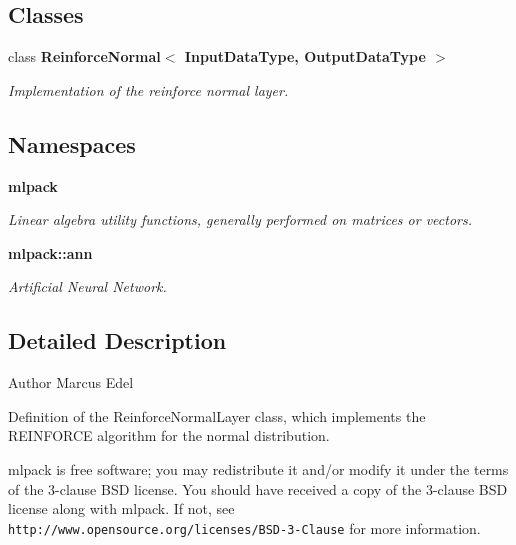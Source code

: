 \subsection*{Classes}
\begin{DoxyCompactItemize}
\item 
class \textbf{ Reinforce\+Normal$<$ Input\+Data\+Type, Output\+Data\+Type $>$}
\begin{DoxyCompactList}\small\item\em Implementation of the reinforce normal layer. \end{DoxyCompactList}\end{DoxyCompactItemize}
\subsection*{Namespaces}
\begin{DoxyCompactItemize}
\item 
 \textbf{ mlpack}
\begin{DoxyCompactList}\small\item\em Linear algebra utility functions, generally performed on matrices or vectors. \end{DoxyCompactList}\item 
 \textbf{ mlpack\+::ann}
\begin{DoxyCompactList}\small\item\em Artificial Neural Network. \end{DoxyCompactList}\end{DoxyCompactItemize}


\subsection{Detailed Description}
\begin{DoxyAuthor}{Author}
Marcus Edel
\end{DoxyAuthor}
Definition of the Reinforce\+Normal\+Layer class, which implements the R\+E\+I\+N\+F\+O\+R\+CE algorithm for the normal distribution.

mlpack is free software; you may redistribute it and/or modify it under the terms of the 3-\/clause B\+SD license. You should have received a copy of the 3-\/clause B\+SD license along with mlpack. If not, see {\tt http\+://www.\+opensource.\+org/licenses/\+B\+S\+D-\/3-\/\+Clause} for more information. 